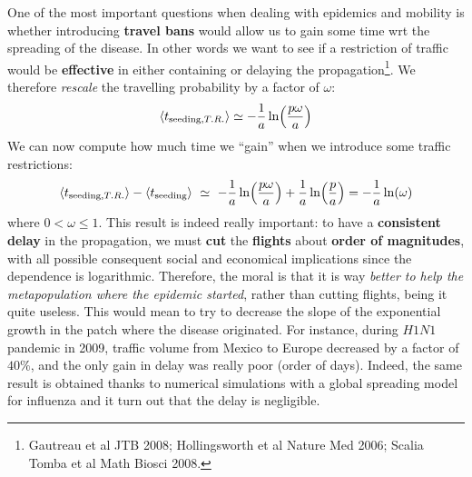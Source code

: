 \documentclass[../main/main.tex]{subfiles}
\begin{document}
One of the most important questions when dealing with epidemics and mobility is whether introducing \textbf{travel bans} would allow us to gain some time wrt the spreading of the disease. In other words we want to see if a restriction of traffic would be \textbf{effective} in either containing or delaying the propagation\footnote{Gautreau et al JTB 2008; Hollingsworth et al Nature Med 2006; Scalia Tomba et al Math Biosci 2008.}.
We therefore \textit{rescale} the travelling probability by a factor of $\omega$:
\begin{equation}
    \expval{t_{\text{seeding}, T.R.}} \simeq  - \frac{1}{a} \ln( \frac{p \omega}{a})
\end{equation}
We can now compute how much time we “gain” when we introduce some traffic restrictions:
\begin{equation}
    \expval{t_{\text{seeding}, T.R.}} - \expval{t_{\text{seeding}}} \ \simeq \  - \frac{1}{a} \ln( \frac{p \omega }{a}) + \frac{1}{a} \ln(\frac{p}{a}) = - \frac{1}{a} \ln(\omega)
\end{equation}
where $ 0 < \omega \leqslant 1$. This result is indeed really important: to have a \textbf{consistent delay} in the propagation, we must \textbf{cut} the \textbf{flights} about \textbf{order of magnitudes}, with all possible consequent social and economical implications since the dependence is logarithmic. Therefore, the moral is that it is way \textit{better to help the metapopulation where the epidemic started}, rather than cutting flights, being it quite useless.
This would mean to try to decrease the slope of the exponential growth in the patch where the disease originated. For instance, during $H1N1$ pandemic in 2009, traffic volume from Mexico to Europe decreased by a factor of $40\%$, and the only gain in delay was really poor (order of days). Indeed, the same result is obtained thanks to numerical simulations with a global spreading model for influenza and it turn out that the delay is negligible.
\end{document}
